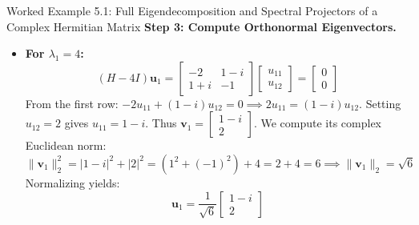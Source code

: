 \begin{examplebox}{Worked Example 5.1: Full Eigendecomposition and Spectral Projectors of a Complex Hermitian Matrix}
\textbf{Step 3: Compute Orthonormal Eigenvectors.}
\begin{itemize}
    \item \textbf{For $\lambda_1 = 4$:}
    \begin{equation}
    (H - 4I)\mathbf{u}_1 = \begin{bmatrix} -2 & 1 - i \\ 1 + i & -1 \end{bmatrix} \begin{bmatrix} u_{11} \\ u_{12} \end{bmatrix} = \begin{bmatrix} 0 \\ 0 \end{bmatrix}
    \end{equation}
    From the first row: $-2u_{11} + (1 - i)u_{12} = 0 \implies 2u_{11} = (1 - i)u_{12}$.
    Setting $u_{12} = 2$ gives $u_{11} = 1 - i$. Thus $\mathbf{v}_1 = \begin{bmatrix} 1 - i \\ 2 \end{bmatrix}$.
    We compute its complex Euclidean norm:
    \begin{equation}
    \|\mathbf{v}_1\|_2^2 = |1 - i|^2 + |2|^2 = (1^2 + (-1)^2) + 4 = 2 + 4 = 6 \implies \|\mathbf{v}_1\|_2 = \sqrt{6}
    \end{equation}
    Normalizing yields:
    \begin{equation}
    \mathbf{u}_1 = \frac{1}{\sqrt{6}} \begin{bmatrix} 1 - i \\ 2 \end{bmatrix}
    \end{equation}


\end{itemize}
\end{examplebox}
